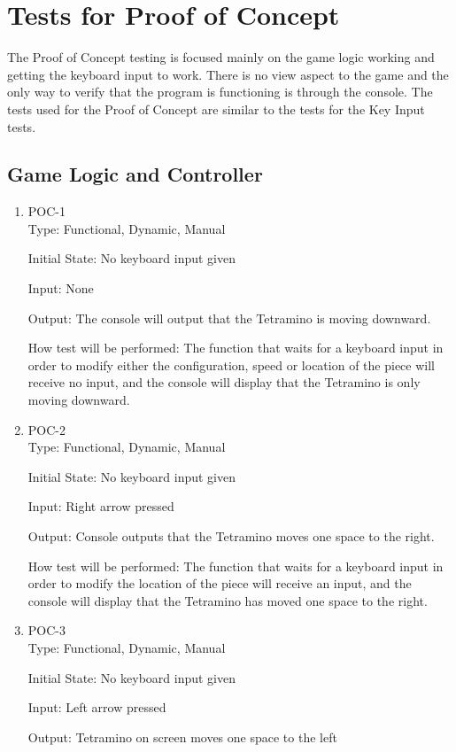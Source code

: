 \documentclass[12pt, titlepage]{article}
\begin{document}
\section{Tests for Proof of Concept}
The Proof of Concept testing is focused mainly on the game logic working and getting the keyboard input to work. There is no view aspect to the game and the only way to verify that the program is functioning is through the console. The tests used for the Proof of Concept are similar to the tests for the Key Input tests.
\subsection{Game Logic and Controller}

\begin{enumerate}
\item{POC-1\\}
Type: Functional, Dynamic, Manual
					
Initial State: No keyboard input given
					
Input: None
					
Output: The console will output that the Tetramino is moving downward.
					
How test will be performed: The function that waits for a keyboard input in order to modify either the configuration, speed or location of the piece will receive no input, and the console will display that the Tetramino is only moving downward.
					
\item{POC-2\\}
Type: Functional, Dynamic, Manual
					
Initial State: No keyboard input given
					
Input: Right arrow pressed
					
Output: Console outputs that the Tetramino moves one space to the right.
					
How test will be performed: The function that waits for a keyboard input in order to modify the location of the piece will receive an input, and the console will display that the Tetramino has moved one space to the right.

\item{POC-3\\}
Type: Functional, Dynamic, Manual
					
Initial State: No keyboard input given
					
Input: Left arrow pressed
					
Output: Tetramino on screen moves one space to the left
					

\end{enumerate}
\end{document}
